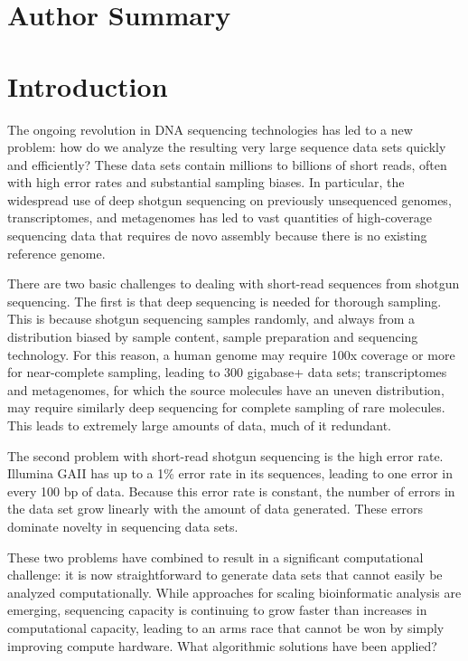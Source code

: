 \documentclass[10pt]{article}
\begin{document}
\section*{Author Summary}

\section*{Introduction}

The ongoing revolution in DNA sequencing technologies has led to a new
problem: how do we analyze the resulting very large sequence data sets
quickly and efficiently? These data sets contain millions to billions
of short reads, often with high error rates and substantial sampling
biases. In particular, the widespread use of deep shotgun sequencing
on previously unsequenced genomes, transcriptomes, and metagenomes has
led to vast quantities of high-coverage sequencing data that requires
de novo assembly because there is no existing reference genome.

There are two basic challenges to dealing with short-read sequences
from shotgun sequencing. The first is that deep sequencing is needed
for thorough sampling. This is because shotgun sequencing samples
randomly, and always from a distribution biased by sample content,
sample preparation and sequencing technology.  For this reason, a
human genome may require 100x coverage or more for near-complete
sampling, leading to 300 gigabase+ data sets; transcriptomes and
metagenomes, for which the source molecules have an uneven
distribution, may require similarly deep sequencing for complete
sampling of rare molecules. This leads to extremely large amounts of
data, much of it redundant.

The second problem with short-read shotgun sequencing is the high
error rate.  Illumina GAII has up to a 1\% error rate in its sequences,
leading to one error in every 100 bp of data.  Because this error rate
is constant, the number of errors in the data set grow linearly with
the amount of data generated.  These errors dominate novelty in
sequencing data sets.

These two problems have combined to result in a significant
computational challenge: it is now straightforward to generate data
sets that cannot easily be analyzed computationally.  While approaches
for scaling bioinformatic analysis are emerging, sequencing capacity
is continuing to grow faster than increases in computational capacity,
leading to an arms race that cannot be won by simply improving compute
hardware.  What algorithmic solutions have been applied?
\end{document}
